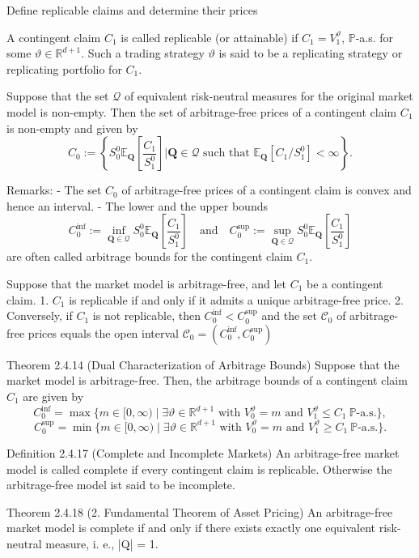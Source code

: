 Define replicable claims and determine their prices

A contingent claim \( C_1 \) is called replicable (or attainable) if
\( C_1 = V_1^\vartheta \),  \( \mathbb{P} \)-a.s. for some \( \vartheta \in \mathbb{R}^{d+1} \).
Such a trading strategy \( \vartheta \) is said to be a replicating strategy or replicating portfolio for
\( C_1 \).


Suppose that the set \(\mathcal{Q}\) of equivalent risk-neutral measures for the original market model is non-empty. 
Then the set of arbitrage-free prices of a contingent claim \(C_1\) is non-empty and given by
\[
C_0 := \left\{ S_0^0 \mathbb{E}_\mathbf{Q} \left[\frac{C_1}{S_1^0}\right] \Big| \mathbf{Q} \in \mathcal{Q} \text{ such that } \mathbb{E}_\mathbf{Q}[C_1/S_1^0] < \infty \right\}.
\]

Remarks:
- The set \(C_0\) of arbitrage-free prices of a contingent claim is convex and hence an interval.
- The lower and the upper bounds
\[
C_0^{\inf} := \inf_{\mathbf{Q} \in \mathcal{Q}} S_0^0 \mathbb{E}_\mathbf{Q} \left[\frac{C_1}{S_1^0}\right] \quad \text{and} \quad C_0^{\sup} := \sup_{\mathbf{Q} \in \mathcal{Q}} S_0^0 \mathbb{E}_\mathbf{Q} \left[\frac{C_1}{S_1^0}\right]
\]
are often called arbitrage bounds for the contingent claim \(C_1\).

Suppose that the market model is arbitrage-free, and let \( C_1 \) be a contingent claim.
1. \( C_1 \) is replicable if and only if it admits a unique arbitrage-free price.
2. Conversely, if \( C_1 \) is not replicable, then \( C^{\text{inf}}_0 < C^{\text{sup}}_0 \)
and the set \( \mathcal{C}_0 \) of arbitrage-free prices equals the open interval
\( \mathcal{C}_{0} = (C^{\text{inf}}_0, C^{\text{sup}}_0) \)

Theorem 2.4.14 (Dual Characterization of Arbitrage Bounds)
Suppose that the market model is arbitrage-free. Then, the arbitrage bounds of a contingent claim \(C_1\) are given by
\[
C_0^{\inf} = \max\{m \in [0, \infty) \mid \exists \vartheta \in \mathbb{R}^{d+1} \text{ with } V_0^\vartheta = m \text{ and } V_1^\vartheta \leq C_1 \ \mathbb{P}\text{-a.s.}\},
\]
\[
C_0^{\sup} = \min\{m \in [0, \infty) \mid \exists \vartheta \in \mathbb{R}^{d+1} \text{ with } V_0^\vartheta = m \text{ and } V_1^\vartheta \geq C_1 \ \mathbb{P}\text{-a.s.}\}.
\]


Definition 2.4.17 (Complete and Incomplete Markets)
An arbitrage-free market model is called complete if every contingent claim is replicable.
Otherwise the arbitrage-free model ist said to be incomplete.


Theorem 2.4.18 (2. Fundamental Theorem of Asset Pricing)
An arbitrage-free market model is complete if and only if there exists exactly one
equivalent risk-neutral measure, i. e., |Q| = 1.
